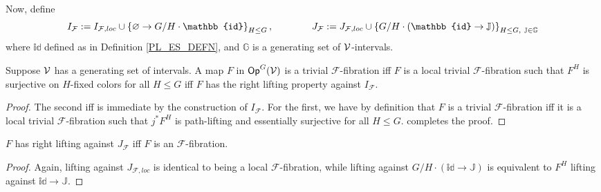 \documentclass[a4paper,10pt
,draft
]{article}%
\renewcommand{\F}{\mathcal F}
\newcommand{\J}{\mathbb J}
\renewcommand{\1}{\ensuremath{\mathbb{id}}}
\begin{document}
Now, define
\begin{equation}
      I_{\F}:= I_{\F, loc} \mathbin{\cup} \set{\varnothing \to G/H \cdot \1}_{H\leq G},
      \qquad \qquad
      J_{\F} := J_{\F, loc} \mathbin{\cup} \set{G/H \cdot (\1 \to \J)}_{H\leq G,\ \J\in\mathbb{G}}
\end{equation}
where $\1$ defined as in Definition \ref{PL_ES_DEFN}, and $\mathbb{G}$ is a generating set of $\mathcal V$-intervals. 

\begin{lemma}
      \label{CAV_4.8}
      Suppose $\mathcal V$ has a generating set of intervals.
      A map $F$ in $\mathsf{Op}^G(\mathcal V)$ is a trivial $\F$-fibration
      iff
      $F$ is a local trivial $\F$-fibration such that $F^H$ is surjective on $H$-fixed colors for all $H\leq G$
      iff
      $F$ has the right lifting property against $I_{\F}$.
\end{lemma}
\begin{proof}
      The second iff is immediate by the construction of $I_{\F}$.
      For the first, we have by definition that
      $F$ is a trivial $\F$-fibration
      iff
      it is a local trivial $\F$-fibration such that $j^*F^H$ is path-lifting and essentially surjective for all $H\leq G$.
      \cite[2.4]{BM13} completes the proof. 
\end{proof}

\begin{lemma}
      $F$ has right lifting against $J_{\F}$ iff $F$ is an $\F$-fibration.
\end{lemma}
\begin{proof}
      Again, lifting against $J_{\F, loc}$ is identical to being a local $\F$-fibration, while lifting against $G/H \cdot (\1 \to \J)$
      is equivalent to $F^H$ lifting against $\1 \to \J$.
\end{proof}
\end{document}
